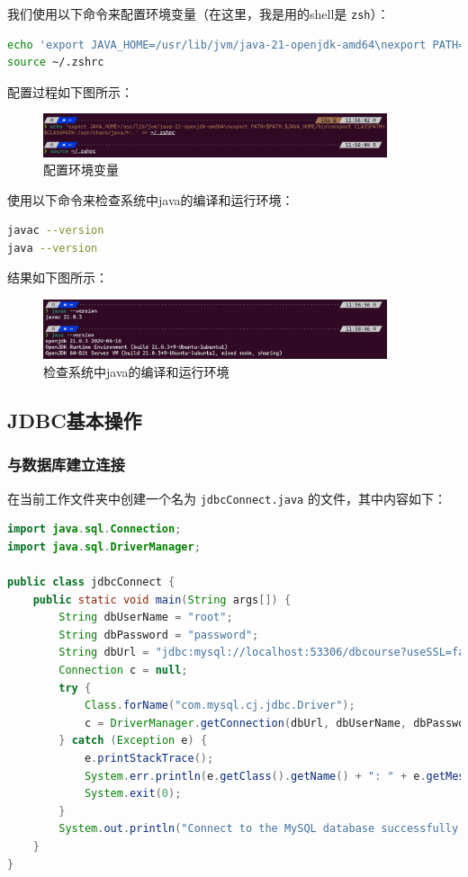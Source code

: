 \documentclass{article}
\renewcommand\tt{\texttt}
\begin{document}
我们使用以下命令来配置环境变量（在这里，我是用的shell是 \tt{zsh}）：

\begin{lstlisting}[language=bash]
echo 'export JAVA_HOME=/usr/lib/jvm/java-21-openjdk-amd64\nexport PATH=$PATH:$JAVA_HOME/bin\nexport CLASSPATH=$CLASSPATH:/usr/share/java/*:.' >> ~/.zshrc
source ~/.zshrc
\end{lstlisting}

配置过程如下图所示：

\begin{figure}[H]
  \centering
  \includegraphics[width=0.9\textwidth]{img/3.png}
  \caption{配置环境变量}
\end{figure}

使用以下命令来检查系统中java的编译和运行环境：

\begin{lstlisting}[language=bash]
javac --version
java --version
\end{lstlisting}

结果如下图所示：

\begin{figure}[H]
  \centering
  \includegraphics[width=0.9\textwidth]{img/4.png}
  \caption{检查系统中java的编译和运行环境}
\end{figure}

\subsection{JDBC基本操作}

\subsubsection{与数据库建立连接}

在当前工作文件夹中创建一个名为 \tt{jdbcConnect.java} 的文件，其中内容如下：

\begin{lstlisting}[language=java]
import java.sql.Connection;
import java.sql.DriverManager;

public class jdbcConnect {
    public static void main(String args[]) {
        String dbUserName = "root";
        String dbPassword = "password";
        String dbUrl = "jdbc:mysql://localhost:53306/dbcourse?useSSL=false&allowPublicKeyRetrieval=true";
        Connection c = null;
        try {
            Class.forName("com.mysql.cj.jdbc.Driver");
            c = DriverManager.getConnection(dbUrl, dbUserName, dbPassword);
        } catch (Exception e) {
            e.printStackTrace();
            System.err.println(e.getClass().getName() + ": " + e.getMessage());
            System.exit(0);
        }
        System.out.println("Connect to the MySQL database successfully !");
    }
}
  \end{lstlisting}
\end{document}
